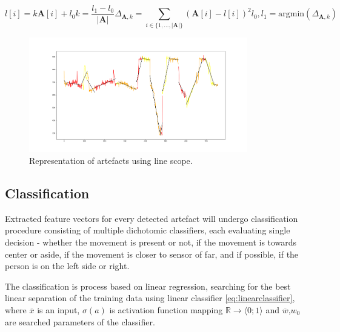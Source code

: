 \begin{subequations}
\begin{equation}
l[i] = k\textbf{A}[i] + l_0
\end{equation}
\begin{equation}
k = \frac{l_1 - l_0}{|\textbf{A}|}
\end{equation}
\begin{equation}
\Delta _{\textbf{A},k} = \sum_{i \in \{1,...,|\textbf{A}|\}} (\textbf{A}[i]-l[i])^2
\end{equation}
\begin{equation}
l_0,l_1 = \text{argmin} ( \Delta_{\textbf{A},k} )
\end{equation}
\label{eq:artefactline}
\end{subequations}

\begin{figure}[h!]
\begin{center}
\includegraphics[width=0.85\textwidth]{render/signallines.png}
\caption{Representation of artefacts using line scope.\label{fig:siglines}}
\end{center}
\end{figure}

\subsection*{Classification}
Extracted feature vectors for every detected artefact will undergo classification procedure
consisting of multiple dichotomic classifiers, each evaluating single decision - whether
the movement is present or not, if the movement is towards center or aside, if the
movement is closer to sensor of far, and if possible, if the person is on the left side
or right.

The classification is process based on linear regression, searching for the best linear
separation of the training data using linear classifier \ref{eq:linearclassifier}, where 
$\overline{x}$ is an input, $\sigma(a)$ is activation function mapping
$\mathbb{R} \rightarrow \langle 0;1\rangle$ and $\overline{w}$,$w_0$ are searched parameters
of the classifier.


